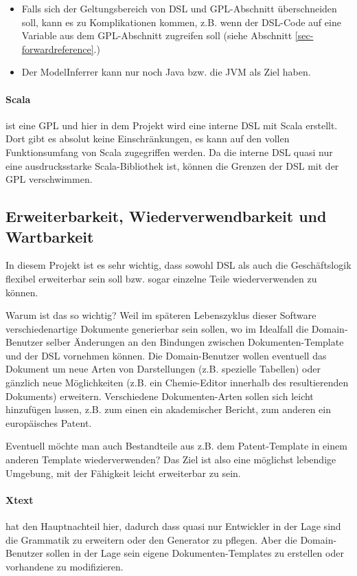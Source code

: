 \begin{itemize}
  \item Falls sich der Geltungsbereich von DSL und GPL-Abschnitt überschneiden
        soll, kann es zu Komplikationen kommen, z.B. wenn der DSL-Code
        auf eine Variable aus dem GPL-Abschnitt zugreifen soll (siehe
        Abschnitt \ref{sec-forwardreference}.)
  \item Der ModelInferrer kann nur noch Java bzw. die JVM als Ziel haben.
\end{itemize}

\paragraph{Scala} ist eine GPL und hier in dem Projekt wird eine interne
DSL mit Scala erstellt. Dort gibt es absolut keine Einschränkungen, es
kann auf den vollen Funktionsumfang von Scala zugegriffen werden.
Da die interne DSL quasi nur eine ausdrucksstarke Scala-Bibliothek ist,
können die Grenzen der DSL mit der GPL verschwimmen.


\subsection{Erweiterbarkeit, Wiederverwendbarkeit und Wartbarkeit}
\label{sec-erweiterbar}

In diesem Projekt ist es sehr wichtig, dass sowohl DSL als auch
die Geschäftslogik flexibel erweiterbar sein soll bzw. sogar
einzelne Teile wiederverwenden zu können.

Warum ist das so wichtig? Weil im späteren Lebenszyklus dieser Software
verschiedenartige Dokumente generierbar sein sollen, wo im Idealfall
die Domain-Benutzer selber Änderungen an den Bindungen zwischen
Dokumenten-Template und der DSL vornehmen können. Die Domain-Benutzer
wollen eventuell das Dokument um neue Arten von Darstellungen (z.B. spezielle
Tabellen) oder gänzlich neue Möglichkeiten (z.B. ein Chemie-Editor
innerhalb des resultierenden Dokuments) erweitern.
Verschiedene Dokumenten-Arten sollen sich leicht hinzufügen lassen,
z.B. zum einen ein akademischer Bericht, zum anderen ein europäisches Patent.

Eventuell möchte man auch Bestandteile aus z.B. dem Patent-Template in
einem anderen Template wiederverwenden? Das Ziel ist also eine
möglichst lebendige Umgebung, mit der Fähigkeit leicht erweiterbar zu sein.

\paragraph{Xtext} hat den Hauptnachteil hier, dadurch dass quasi nur
Entwickler in der Lage sind die Grammatik zu erweitern oder den
Generator zu pflegen. Aber die Domain-Benutzer sollen in der Lage sein
eigene Dokumenten-Templates zu erstellen oder vorhandene zu modifizieren.

